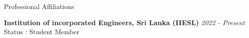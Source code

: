 \documentclass[
	11pt, %
]{./../assets/resume} %
\begin{document}


\begin{rSection}{Professional Affiliations}

	\textbf{Institution of incorporated Engineers, Sri Lanka (IIESL)} \hfill \textit{2022 - Present} \\ 
	Status : Student Member

\end{rSection}









\end{document}
